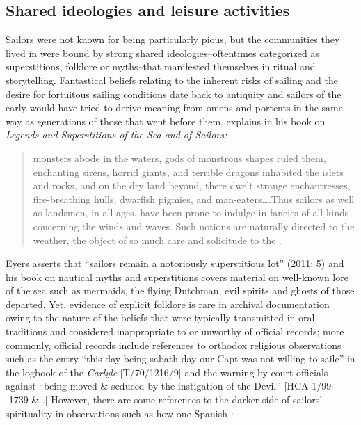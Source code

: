 \subsection{{Shared ideologies and leisure activities}}%

Sailors were not known for being particularly pious, but the communities they lived in were bound by strong shared ideologies--oftentimes categorized as superstitions, folklore or myths--that manifested themselves in ritual and storytelling. Fantastical beliefs relating to the inherent risks of sailing and the desire for fortuitous sailing conditions date back to antiquity and sailors of the early  would have tried to derive meaning from omens and portents in the same way as generations of those that went before them. \citet{Bassett1885} explains in his book on \textit{Legends and Superstitions of the Sea and of Sailors:}

\begin{quotation}
monsters abode in the waters, gods of monstrous shapes ruled them, enchanting sirens, horrid giants, and terrible dragons inhabited the islets and rocks, and on the dry land beyond, there dwelt strange enchantresses, fire-breathing hulls, dwarfish pigmies, and man-eaters….Thus sailors as well as landsmen, in all ages, have been prone to indulge in fancies of all kinds concerning the winds and waves. Such notions are naturally directed to the weather, the object of so much care and solicitude to the . \citep[12]{Bassett1885}
\end{quotation}

Eyers asserts that “sailors remain a notoriously superstitious lot” (2011: 5) and his book on nautical myths and superstitions covers material on well-known lore of the sea such as mermaids, the flying Dutchman, evil spirits and ghosts of those departed. Yet, evidence of explicit folklore is rare in archival documentation owing to the nature of the beliefs that were typically transmitted in oral traditions and considered inappropriate to or unworthy of official records; more commonly, official records include references to orthodox religious observations such as the entry “this day being sabath day our Capt was not willing to saile” in the logbook of the \textit{Carlyle} [T/70/1216/9] and the warning by court officials against “being moved \& seduced by the instigation of the Devil” [HCA 1/99 \citealt{Jamaica1738}-1739 \&  \citealt{Islands1722}.] However, there are some references to the darker side of sailors’ spirituality in observations such as how one Spanish : 

